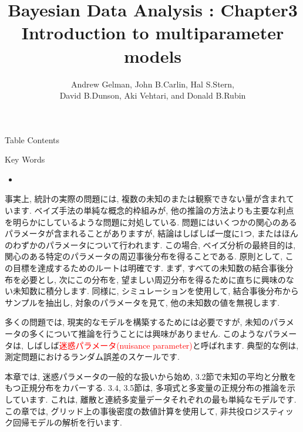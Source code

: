 \documentclass[10pt,dvipdfmx,a4]{beamer}
\title{Bayesian Data Analysis : Chapter3 \\Introduction to multiparameter models}
\subtitle{Andrew Gelman, John B.Carlin, Hal S.Stern,\\David B.Dunson, Aki Vehtari, and Donald B.Rubin}
\newcommand{\tcr}[1]{\textcolor{red}{#1}}
\begin{document}
\frame{\titlepage}

\begin{frame}{Table Contents}
\begin{multicols}{2}
{\scriptsize \tableofcontents}
\end{multicols}
\end{frame}

\begin{frame}{Key Words}
\begin{multicols}{2}
{\scriptsize \begin{itemize}
\item 
\end{itemize}}
\end{multicols}
\end{frame}


\begin{frame}
事実上, 統計の実際の問題には, 複数の未知のまたは観察できない量が含まれています.
ベイズ手法の単純な概念的枠組みが, 他の推論の方法よりも主要な利点を明らかにしているような問題に対処している.
問題にはいくつかの関心のあるパラメータが含まれることがありますが, 結論はしばしば一度に1つ, またはほんのわずかのパラメータについて行われます.
この場合, ベイズ分析の最終目的は, 関心のある特定のパラメータの周辺事後分布を得ることである.
原則として, この目標を達成するためのルートは明確です.
まず, すべての未知数の結合事後分布を必要とし, 次にこの分布を, 望ましい周辺分布を得るために直ちに興味のない未知数に積分します.
同様に, シミュレーションを使用して, 結合事後分布からサンプルを抽出し, 対象のパラメータを見て, 他の未知数の値を無視します.
\end{frame}


\begin{frame}
多くの問題では, 現実的なモデルを構築するためには必要ですが, 未知のパラメータの多くについて推論を行うことには興味がありません.
このようなパラメータは, しばしば\tcr{迷惑パラメータ(nuisance parameter)}と呼ばれます.
典型的な例は, 測定問題におけるランダム誤差のスケールです.

本章では, 迷惑パラメータの一般的な扱いから始め, 3.2節で未知の平均と分散をもつ正規分布をカバーする.
3.4, 3.5節は, 多項式と多変量の正規分布の推論を示しています.
これは, 離散と連続多変量データそれぞれの最も単純なモデルです.
この章では, グリッド上の事後密度の数値計算を使用して, 非共役ロジスティック回帰モデルの解析を行います.
\end{frame}
\end{document}
